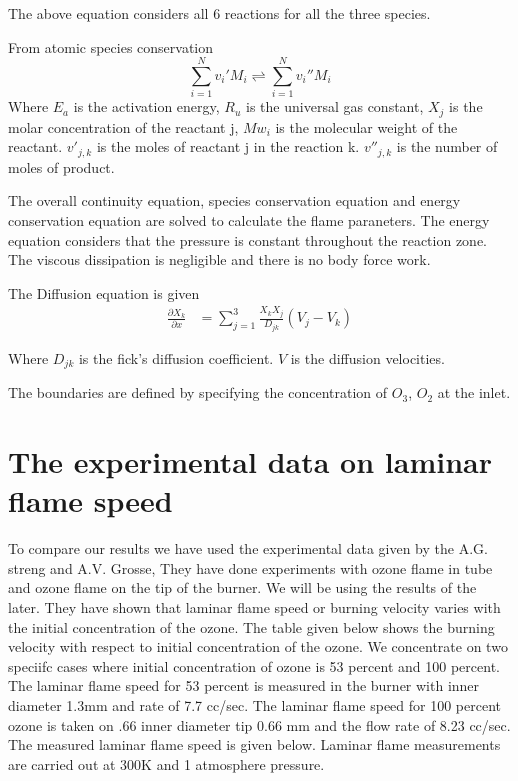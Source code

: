 \documentclass[10pt]{ubthesis}
\begin{document}
\noindent The above equation considers all 6 reactions for all the three species. 

\noindent From atomic species conservation 
	$$\sum_{i=1}^{N} v_i{'}M_i \rightleftharpoons \sum_{i=1}^{N} v_i{''}M_i $$
\noindent Where $E_a$ is the activation energy, $R_u$ is the universal gas constant, $X_j$ is the molar concentration of the reactant j, $Mw_i$ is the molecular weight of the reactant. $v'_{j,k}$ is the moles of reactant j in the reaction k. $v''_{j,k}$ is the number of moles of product. 

\bigskip

\noindent The overall continuity equation, species conservation equation and energy conservation equation are solved to calculate the flame paraneters. The energy equation considers that the pressure is constant throughout the reaction zone. The viscous dissipation is negligible and there is no body force work. 

\noindent The Diffusion equation is given 
\begin{eqnarray}
\frac{\partial X_k}{\partial x} &= \sum_{j=1}^{3} \frac{X_k X_j}{D_{jk}} (V_j - V_k)
\end{eqnarray}

\noindent Where $D_{jk}$ is the fick's diffusion coefficient. $V$ is the diffusion velocities. 

\noindent The boundaries are defined by specifying the concentration of $O_3$, $O_2$ at the inlet. 

\section{The experimental data on laminar flame speed}

To compare our results we have used the experimental data given by the A.G.  streng and A.V. Grosse, They have done experiments with ozone flame in tube and ozone flame on the tip of the burner. We will be using the results of the later. They have shown that laminar flame speed or burning velocity varies with the initial concentration of the ozone. The table given below shows the burning velocity with respect to initial concentration of the ozone. We concentrate on two speciifc cases where initial concentration of ozone is 53 percent and 100 percent. The laminar flame speed for 53 percent is measured in the burner with inner diameter 1.3mm  and rate of 7.7 cc/sec. The laminar flame speed for 100 percent ozone is taken on .66 inner diameter tip 0.66 mm and the flow rate of 8.23 cc/sec. 
The measured laminar flame speed is given below. Laminar flame measurements are carried out at 300K and 1 atmosphere pressure. 
\end{document}
